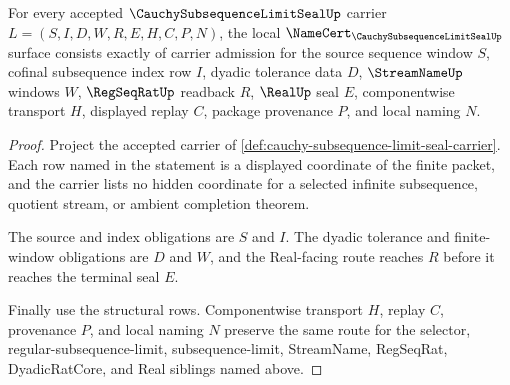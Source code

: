 \begin{theorem}
\label{thm:cauchy-subsequence-limit-seal-namecert-obligations}
For every accepted $\CauchySubsequenceLimitSealUp$ carrier $L=(S,I,D,W,R,E,H,C,P,N)$, the local $\NameCert_{\CauchySubsequenceLimitSealUp}$ surface consists exactly of carrier admission for the source sequence window $S$, cofinal subsequence index row $I$, dyadic tolerance data $D$, $\StreamNameUp$ windows $W$, $\RegSeqRatUp$ readback $R$, $\RealUp$ seal $E$, componentwise transport $H$, displayed replay $C$, package provenance $P$, and local naming $N$.
\end{theorem}
\begin{proof}
Project the accepted carrier of \autoref{def:cauchy-subsequence-limit-seal-carrier}. Each row named in the statement is a displayed coordinate of the finite packet, and the carrier lists no hidden coordinate for a selected infinite subsequence, quotient stream, or ambient completion theorem.

The source and index obligations are $S$ and $I$. The dyadic tolerance and finite-window obligations are $D$ and $W$, and the Real-facing route reaches $R$ before it reaches the terminal seal $E$.

Finally use the structural rows. Componentwise transport $H$, replay $C$, provenance $P$, and local naming $N$ preserve the same route for the selector, regular-subsequence-limit, subsequence-limit, StreamName, RegSeqRat, DyadicRatCore, and Real siblings named above.
\end{proof}


